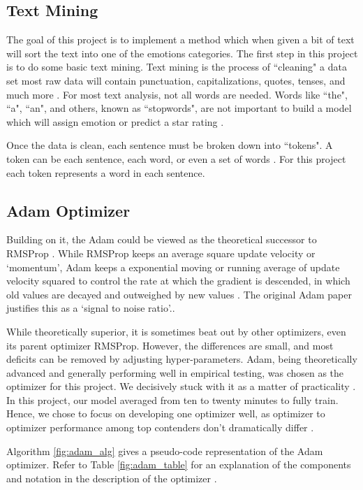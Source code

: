 \documentclass[titlepage,letterpaper]{article}
\begin{document}
\subsection{Text Mining}
The goal of this project is to implement a method which when given a bit of text will sort the text into one of the emotions categories. The first step in this project is to do some basic text mining. Text mining is the process of ``cleaning" a data set most raw data will contain punctuation, capitalizations, quotes, tenses, and much more \cite{TextMining}. For most text analysis, not all words are needed. Words like ``the", ``a", ``an", and others, known as ``stopwords", are not important to build a model which will assign emotion or predict a star rating \cite{TextMining}. 

Once the data is clean, each sentence must be broken down into ``tokens". A token can be each sentence, each word, or even a set of words \cite{TextMining}. For this project each token represents a word in each sentence. 

\subsection{Adam Optimizer}

Building on it, the Adam could be viewed as the theoretical successor to RMSProp \cite{adam}. While RMSProp keeps an average square update velocity or `momentum'\cite{rmsprop}, Adam keeps a exponential moving or running average of update velocity squared to control the rate at which the gradient is descended, in which old values are decayed and outweighed by new values \cite{adam}. The original Adam paper justifies this as a `signal to noise ratio'.\cite{adam}.

While theoretically superior, it is sometimes beat out by other optimizers, even its parent optimizer RMSProp. However, the differences are small, and most deficits can be removed by adjusting hyper-parameters. Adam, being theoretically advanced and generally performing well in empirical testing, was chosen as the optimizer for this project. We decisively stuck with it as a matter of practicality \cite{learn}. In this project, our model averaged from ten to twenty minutes to fully train. Hence, we chose to focus on developing one optimizer well, as optimizer to optimizer performance among top contenders don't dramatically differ \cite{learn}.

Algorithm \ref{fig:adam_alg} gives a pseudo-code representation of the Adam optimizer. Refer to Table \cref{fig:adam_table} for an explanation of the components and notation in the description of the optimizer \cite{adam}.
\end{document}
